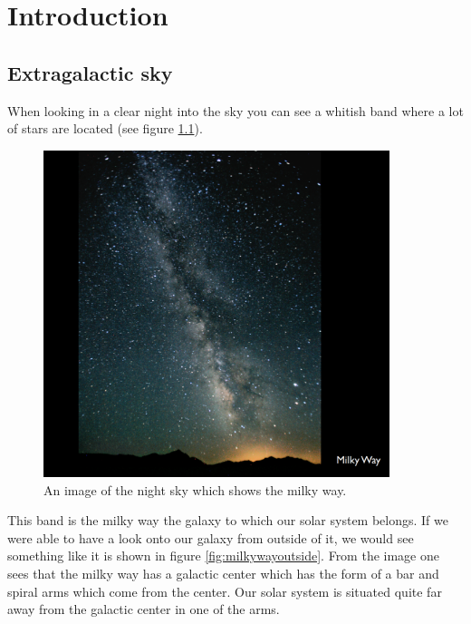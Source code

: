 \chapter{Introduction}

\section{Extragalactic sky}
When looking in a clear night into the sky you can see a whitish band where a lot of stars are located (see figure \ref{fig:milkyway}). 
\begin{figure}[H]
	\centering
		\includegraphics[width=0.9\textwidth]{img/ch-01/milkyway.png}
		\caption{An image of the night sky which shows the milky way.}
		\label{fig:milkyway}
\end{figure}
This band is the milky way the galaxy to which our solar system belongs. If we were able to have a look onto our galaxy from outside of it, we would see something like it is shown in figure \ref{fig:milkywayoutside}. From the image one sees that the milky way has a galactic center which has the form of a bar and spiral arms which come from the center. Our solar system is situated quite far away from the galactic center in one of the arms. 
